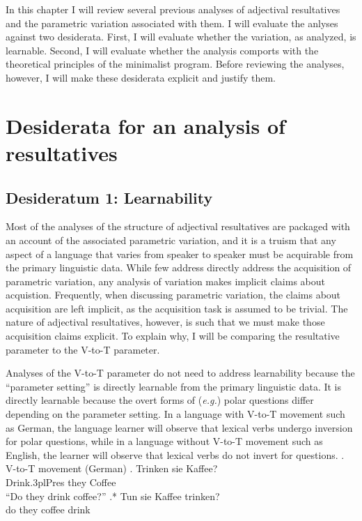 \documentclass[MilwayThesis]{subfiles}
\begin{document}
In this chapter I will review several previous analyses of adjectival resultatives and the parametric variation associated with them.
I will evaluate the anlyses against two desiderata.
First, I will evaluate whether the variation, as analyzed, is learnable.
Second, I will evaluate whether the analysis comports with the theoretical principles of the minimalist program.
Before reviewing the analyses, however, I will make these desiderata explicit and justify them.

\section{Desiderata for an analysis of resultatives}

\subsection{Desideratum 1: Learnability}
Most of the analyses of the structure of adjectival resultatives are packaged with an account of the associated parametric variation, and it is a truism that any aspect of a language that varies from speaker to speaker must be acquirable from the primary linguistic data.
While few address directly address the acquisition of parametric variation, any analysis of variation makes implicit claims about acquistion.
Frequently, when discussing parametric variation, the claims about acquisition are left implicit, as the acquisition task is assumed to be trivial.
The nature of adjectival resultatives, however, is such that we must make those acquisition claims explicit.
To explain why, I will be comparing the resultative parameter to the V-to-T parameter.

Analyses of the V-to-T parameter do not need to address learnability because the ``parameter setting'' is directly learnable from the primary linguistic data.
It is directly learnable because the overt forms of (\textit{e.g.}) polar questions differ depending on the parameter setting.
In a language with V-to-T movement such as German, the language learner will observe that lexical verbs undergo inversion for polar questions, while in a language without V-to-T movement such as English, the learner will observe that lexical verbs do not invert for questions.
\ex. V-to-T movement (German)
\ag. Trinken sie Kaffee?\\
Drink.3plPres they Coffee\\
``Do they drink coffee?''
\bg.* Tun sie Kaffee trinken?\\
do they coffee drink\\
\end{document}
